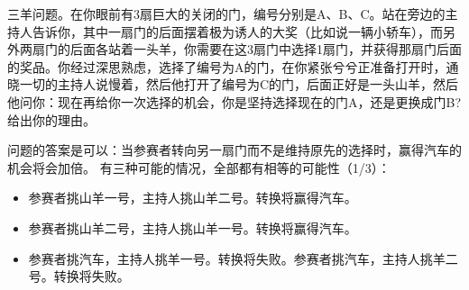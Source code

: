 \begin{problem}
	
	三羊问题。在你眼前有$3$扇巨大的关闭的门，编号分别是A、B、C。站在旁边的主持人告诉你，其中一扇门的后面摆着极为诱人的大奖（比如说一辆小轿车），而另外两扇门的后面各站着一头羊，你需要在这3扇门中选择1扇门，并获得那扇门后面的奖品。你经过深思熟虑，选择了编号为A的门，在你紧张兮兮正准备打开时，通晓一切的主持人说慢着，然后他打开了编号为C的门，后面正好是一头山羊，然后他问你：现在再给你一次选择的机会，你是坚持选择现在的门A，还是更换成门B?给出你的理由。
\end{problem}
\begin{solution}
	问题的答案是可以：当参赛者转向另一扇门而不是维持原先的选择时，赢得汽车的机会将会加倍。
	有三种可能的情况，全部都有相等的可能性（1/3）：
	\begin{itemize}
		\item 参赛者挑山羊一号，主持人挑山羊二号。转换将赢得汽车。
		\item 参赛者挑山羊二号，主持人挑山羊一号。转换将赢得汽车。
		\item 参赛者挑汽车，主持人挑羊一号。转换将失败。参赛者挑汽车，主持人挑羊二号。转换将失败。
	\end{itemize}
\end{solution}



